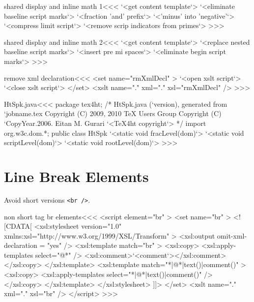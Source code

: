 \documentclass{article}
\begin{document}
\<shared display and inline math 1\><<<
`<get content template`>
`<eliminate baseline script marks`> 
`<fraction 'and' prefix`> 
`<'minus' into 'negative'`> 
`<compress limit script`>
`<remove scrip indicators from primes`> 
>>>


\<shared display and inline math 2\><<<
`<get content template`>
`<replace nested baseline script marks`>
`<insert pre mi spaces`>
`<eliminate begin script marks`> 
>>>




\<remove xml declaration\><<<
<set name="rmXmlDecl" >
  `<open xslt script`>
  `<close xslt script`>
</set>
<xslt name="." xml="." xsl="rmXmlDecl" />
>>>









\<HtSpk.java\><<<
package tex4ht;
/* HtSpk.java (`version), generated from `jobname.tex
   Copyright (C) 2009, 2010 TeX Users Group
   Copyright (C) `CopyYear.2006. Eitan M. Gurari
`<TeX4ht copyright`> */
import org.w3c.dom.*;
public class HtSpk {
  `<static void fracLevel(dom)`>
  `<static void scriptLevel(dom)`>
  `<static void rootLevel(dom)`>
}
>>>


\section{Line Break Elements}

Avoid short versions \verb+<br />+.

\<non short tag br elements\><<<
<script element="br" >
  <set name="br" >
    <![CDATA[ 
       <xsl:stylesheet version="1.0"
          xmlns:xsl="http://www.w3.org/1999/XSL/Transform"
       >
          <xsl:output omit-xml-declaration = "yes" />
          <xsl:template match="br" >
            <xsl:copy>
              <xsl:apply-templates select="@*" />
              <xsl:comment>`<comment`></xsl:comment>
            </xsl:copy>
          </xsl:template> 
          <xsl:template match="*|@*|text()|comment()" >
            <xsl:copy>
              <xsl:apply-templates select="*|@*|text()|comment()" />
            </xsl:copy>
          </xsl:template>
       </xsl:stylesheet> 
    ]]>
  </set>
  <xslt name="." xml="." xsl="br" />
</script> 
>>>
\end{document}
